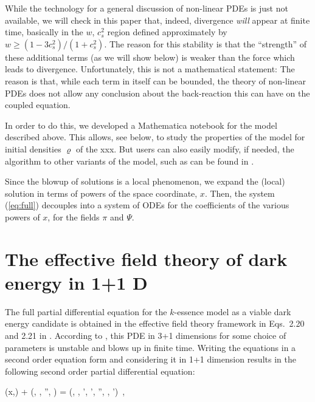 \documentclass[12pt,a4paper]{article}
\let\rho=\varrho
\def\eref#1{(\ref{#1})}
\numberwithin{equation}{section}
\theoremstyle{definition} %
\def\citep#1{\cite{#1}}
\newcommand{\NN}{\mathcal {N}}
\newcommand{\LL}{\mathcal {L}}
\begin{document}
While the technology for a general discussion of non-linear PDEs is
just not available, we will check in this paper that, indeed,
divergence \emph{will} appear at finite time, basically in the $w$,
$c_s^2$ region defined approximately by $w\ge (1-3c_s^2)/(1+c_s^2)$.
The reason for this stability is that the ``strength'' of these
additional terms (as we will show below) is weaker than the force
which leads to divergence. Unfortunately, this is not a mathematical
statement: The reason is that, while each term in itself can be
bounded, the theory of non-linear PDEs does not allow any conclusion
about the back-reaction this can have on the coupled equation.

In order to do this, we developed a Mathematica notebook for the model
described above. This allows, see below, to study the properties of the
model for initial densities $\rho$ of the xxx. But users can also
easily modify, if needed, the algorithm to other variants of the
model, such as can be found in \citep{xxx,xxx}.

Since the blowup of solutions is a local phenomenon, we expand the
(local) solution in terms of powers of the space coordinate,
$x$. Then, the system \eref{eq:full} decouples into a system of ODEs
for the coefficients of the various powers of $x$, for the fields
$\pi$ and $\Psi$.



\section{The effective field theory of dark energy in 1+1 D}
The full partial differential equation for the $k$-essence model as a
viable dark energy candidate is obtained in the effective field theory
framework in Eqs.~2.20 and 2.21 in \cite{Hassani:2019lmy}. According
to \cite{Hassani:2019lmy}, this PDE in 3+1 dimensions for some choice of
parameters is unstable and blows up in finite time. Writing the
equations in a second order equation form and considering it in 1+1
dimension results in the following second order partial differential
equation:
\begin{equa}
 \ddot{\pi}(x,\tau) +  \LL (\pi, \dot \pi, \pi'', \Psi)  =  \NN (\pi,  	\dot \pi,   \pi',    \dot \pi',  \pi'', \Psi, \Psi') \,, \label{full_equation}
\end{equa}
\end{document}
